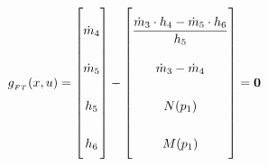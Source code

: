 \begin{equation} \label{eq:Gflashtank}\renewcommand{\arraystretch}{2.5}
	g_{_{FT}}(x,u) =  \begin{bmatrix}
		\dot{m}_{4} \\
		\dot{m}_{5} \\
		h_{5}       \\
		h_{6}
	\end{bmatrix}
	-
	\begin{bmatrix}
		\dfrac{\dot{m}_{3} \cdot h_4 - \dot{m}_{5} \cdot h_6}{h_5} \\
		\dot{m}_{3} - \dot{m}_{4}                                  \\
		N(p_1)                                                     \\
		M(p_1)
	\end{bmatrix}
	=\textbf{0}
\end{equation}



